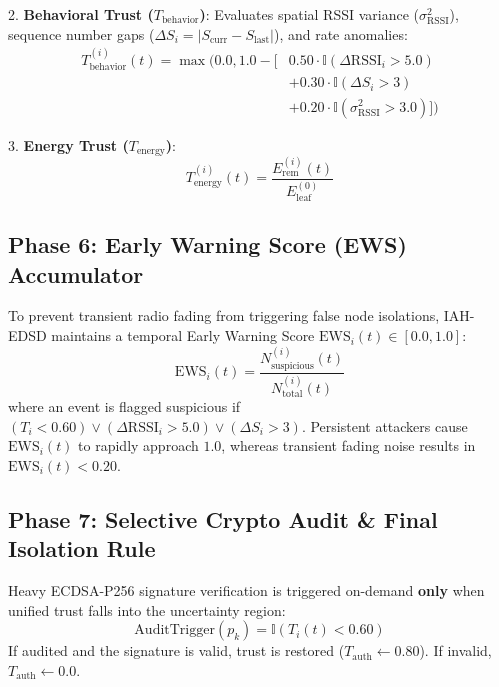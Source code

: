 \documentclass[journal]{IEEEtran}
\begin{document}
2. \textbf{Behavioral Trust ($T_{\text{behavior}}$)}: Evaluates spatial RSSI variance ($\sigma_{\text{RSSI}}^2$), sequence number gaps ($\Delta S_i = |S_{\text{curr}} - S_{\text{last}}|$), and rate anomalies:
\begin{equation}
\begin{aligned}
T_{\text{behavior}}^{(i)}(t) = \max \Big( 0.0, 1.0 - \big[ &0.50 \cdot \mathbb{I}(\Delta \text{RSSI}_i > 5.0) \\
&+ 0.30 \cdot \mathbb{I}(\Delta S_i > 3) \\
&+ 0.20 \cdot \mathbb{I}(\sigma_{\text{RSSI}}^2 > 3.0) \big] \Big)
\end{aligned}
\end{equation}

3. \textbf{Energy Trust ($T_{\text{energy}}$)}:
\begin{equation}
T_{\text{energy}}^{(i)}(t) = \frac{E_{\text{rem}}^{(i)}(t)}{E_{\text{leaf}}^{(0)}}
\end{equation}

\subsection{Phase 6: Early Warning Score (EWS) Accumulator}
To prevent transient radio fading from triggering false node isolations, IAH-EDSD maintains a temporal Early Warning Score $\text{EWS}_i(t) \in [0.0, 1.0]$:
\begin{equation}
\text{EWS}_i(t) = \frac{N_{\text{suspicious}}^{(i)}(t)}{N_{\text{total}}^{(i)}(t)}
\end{equation}
where an event is flagged suspicious if $(T_i < 0.60) \lor (\Delta \text{RSSI}_i > 5.0) \lor (\Delta S_i > 3)$. Persistent attackers cause $\text{EWS}_i(t)$ to rapidly approach $1.0$, whereas transient fading noise results in $\text{EWS}_i(t) < 0.20$.

\subsection{Phase 7: Selective Crypto Audit \& Final Isolation Rule}
Heavy ECDSA-P256 signature verification is triggered on-demand \textbf{only} when unified trust falls into the uncertainty region:
\begin{equation}
\text{AuditTrigger}(p_k) = \mathbb{I}(T_i(t) < 0.60)
\end{equation}
If audited and the signature is valid, trust is restored ($T_{\text{auth}} \leftarrow 0.80$). If invalid, $T_{\text{auth}} \leftarrow 0.0$.
\end{document}
